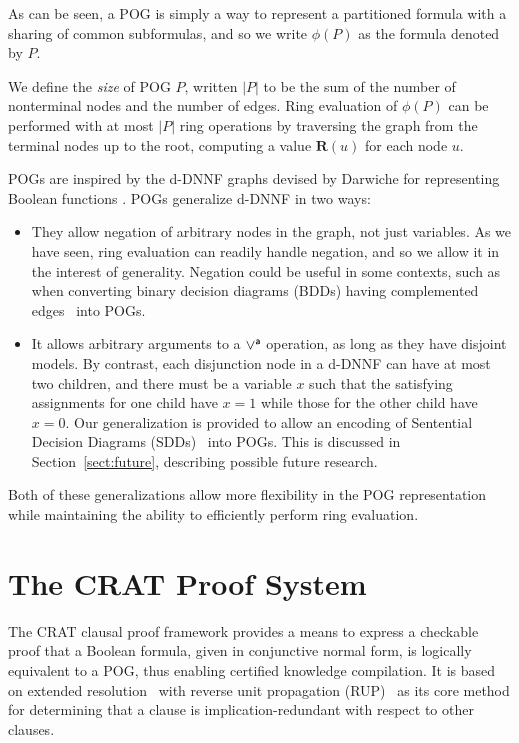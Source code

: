 \documentclass[letterpaper,USenglish,cleveref, autoref, thm-restate]{lipics-v2021}
\newcommand{\por}{\mathbin{\lor^{\sf a}}}
\newcommand{\rep}{\textbf{R}}
\begin{document}
As can be seen, a POG is simply a way to represent a partitioned
formula with a sharing of common subformulas, and so we write
$\phi(P)$ as the formula denoted by $P$.

We define the {\em size} of POG $P$, written $|P|$ to be the sum of
the number of nonterminal nodes and the number of edges.  Ring
evaluation of $\phi(P)$ can be performed with at most $|P|$ ring
operations by traversing the graph from the terminal nodes up to
the root, computing a value $\rep(u)$ for each node $u$.

POGs are inspired by the d-DNNF graphs devised by Darwiche for
representing Boolean functions \cite{darwiche:jair:2002}.
POGs generalize d-DNNF in two ways:
\begin{itemize}
\item They allow negation of arbitrary nodes in the graph, not just
  variables.  As we have seen, ring evaluation can readily handle negation, and so we allow it in the interest of generality.
  Negation could be useful in some contexts, such as when
  converting binary decision diagrams (BDDs) having complemented
  edges~\cite{brace-dac-1990,minato-dac-1990} into POGs.

\item It allows arbitrary arguments to a $\por$ operation, as long as
  they have disjoint models.  By contrast, each
  disjunction node in a d-DNNF can have at most two children, and there must be a variable $x$ such that
  the satisfying assignments for one child have $x=1$ while those for the
  other child have $x=0$.  Our generalization is provided to allow an
  encoding of Sentential Decision Diagrams (SDDs)~\cite{darwiche:ijcai:2011} into
  POGs.  This is discussed in Section~\ref{sect:future}, describing possible future research.
\end{itemize}
  Both of these generalizations allow more flexibility in the POG
  representation while maintaining the ability to efficiently perform ring evaluation.


\section{The CRAT Proof System}

The CRAT clausal proof framework provides a means to express a
checkable proof that a Boolean formula, given in conjunctive normal
form, is logically equivalent to a POG\@, thus enabling certified
knowledge compilation.  It is based on extended
resolution~\cite{Tseitin:1983} with reverse unit propagation
(RUP)~\cite{goldberg,vangelder08_verifying_rup_proofs} as its core method for
determining that a clause is implication-redundant with respect to other clauses.
\end{document}
